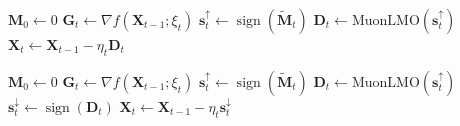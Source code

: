 \begin{minipage}[t]{0.49\linewidth}
\setlength{\algwidth}{\linewidth}
\vspace{0pt}
\begin{algorithm}[H]
\algnarrow
    \caption{MuonUSign}
    \label{alg:muon_usign}
    \begin{algorithmic}[1]
    \State $\mathbf{M}_0 \gets 0$
        \State $\mathbf{G}_t \gets \nabla f(\mathbf{X}_{t-1};\xi_t)$
        \State {}
        \State $\mathbf{s}_t^{\uparrow} \gets \operatorname{sign}(\tilde{\mathbf{M}}_t)$
        \State $\mathbf{D}_t \gets \mathrm{MuonLMO}(\mathbf{s}_t^{\uparrow})$
        \State $\mathbf{X}_{t} \gets \mathbf{X}_{t-1} - \eta_t \mathbf{D}_t$
    \EndFor
    \end{algorithmic}
\end{algorithm}
    
\end{minipage}\hfill
\begin{minipage}[t]{0.49\linewidth}
\setlength{\algwidth}{\linewidth}
\vspace{0pt}
\begin{algorithm}[H]
\algnarrow
    \caption{MuonSign}
    \label{alg:muon_sign}
    \begin{algorithmic}[1]
    \State $\mathbf{M}_0 \gets 0$
        \State $\mathbf{G}_t \gets \nabla f(\mathbf{X}_{t-1};\xi_t)$
        \State {}
        \State $\mathbf{s}_t^{\uparrow} \gets \operatorname{sign}(\tilde{\mathbf{M}}_t)$
        \State $\mathbf{D}_t \gets \mathrm{MuonLMO}(\mathbf{s}_t^{\uparrow})$
        \State $\mathbf{s}_t^{\downarrow} \gets \operatorname{sign}(\mathbf{D}_t)$
        \State $\mathbf{X}_{t} \gets \mathbf{X}_{t-1} - \eta_t \mathbf{s}_t^{\downarrow}$
    \EndFor
    \end{algorithmic}
\end{algorithm}
    
\end{minipage}
\par\medskip
\noindent
